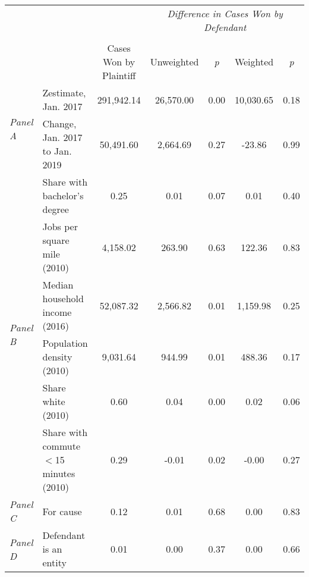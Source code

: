 \begin{tabular}{llccccc}
\toprule
 &  & \textit{} & \multicolumn{4}{c}{\textit{Difference in Cases Won by Defendant}} \\
\cline{4-7}
\\
 &  & Cases Won by Plaintiff & Unweighted & \emph{p} & Weighted & \emph{p} \\
\midrule
\multirow[c]{2}{3cm}{\textit{Panel A}} & Zestimate, Jan. 2017 & 291,942.14 & 26,570.00 & 0.00 & 10,030.65 & 0.18 \\
 & Change, Jan. 2017 to Jan. 2019 & 50,491.60 & 2,664.69 & 0.27 & -23.86 & 0.99 \\
\cline{1-7}
\multirow[c]{6}{3cm}{\textit{Panel B}} & Share with bachelor's degree & 0.25 & 0.01 & 0.07 & 0.01 & 0.40 \\
 & Jobs per square mile (2010) & 4,158.02 & 263.90 & 0.63 & 122.36 & 0.83 \\
 & Median household income (2016) & 52,087.32 & 2,566.82 & 0.01 & 1,159.98 & 0.25 \\
 & Population density (2010) & 9,031.64 & 944.99 & 0.01 & 488.36 & 0.17 \\
 & Share white (2010) & 0.60 & 0.04 & 0.00 & 0.02 & 0.06 \\
 & Share with commute $<$15 minutes (2010) & 0.29 & -0.01 & 0.02 & -0.00 & 0.27 \\
\cline{1-7}
\textit{Panel C} & For cause & 0.12 & 0.01 & 0.68 & 0.00 & 0.83 \\
\cline{1-7}
\textit{Panel D} & Defendant is an entity & 0.01 & 0.00 & 0.37 & 0.00 & 0.66 \\
\cline{1-7}
\bottomrule
\end{tabular}
